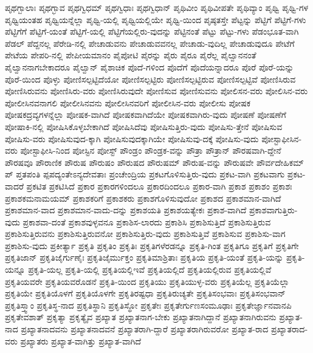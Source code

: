{ಪೃಥಗ್ಬಾಲಾಃ
ಪೃಥಗ್ಭಾವ
ಪೃಥಗ್ವಿಧಮ್
ಪೃಥಗ್ವಿಧಾಃ
ಪೃಥಗ್ವಿಧಾನ್
ಪೃಥಿವೀಂ
ಪೃಥಿವೀಪತೇ
ಪೃಥಿವ್ಯಾಂ
ಪೃಥ್ವಿ
ಪೃಥ್ವಿ-ಗಳ
ಪೃಥ್ವಿಯಂತಹ
ಪೃಥ್ವಿಯನ್ನೆಲ್ಲಾ
ಪೃಥ್ವಿ-ಯಲ್ಲಿ
ಪೃಥ್ವಿಯಲ್ಲಿಯೇ
ಪೃಥ್ವಿ-ಯಿಂದ
ಪೃಷ್ಠತಸ್ತೇ
ಪೆಟ್ಟನ್ನು
ಪೆಟ್ಟಿಗೆ
ಪೆಟ್ಟಿಗೆ-ಗಳು
ಪೆಟ್ಟಿಗೆಗೆ
ಪೆಟ್ಟಿಗೆ-ಯಂತೆ
ಪೆಟ್ಟಿಗೆ-ಯಲ್ಲಿ
ಪೆಟ್ಟಿಗೆಯಲ್ಲಿರು-ವುದನ್ನು
ಪೆಟ್ಟಿನಂತೆ
ಪೆಟ್ಟು
ಪೆಟ್ಟು-ಗಳು
ಪೆಡಂಭೂತ-ವಾಗಿ
ಪೆಡಲ್
ಪೆದ್ದನಲ್ಲ
ಪೆರೇಡಿ-ನಲ್ಲಿ
ಪೇಚಾಡುವನು
ಪೇಚಾಡುವವನಲ್ಲ
ಪೇಚಾಡು-ವುದಿಲ್ಲ
ಪೇಚಾಡುವುದೂ
ಪೇಟೆಗೆ
ಪೇಟೆಯ
ಪೇಪರಿ-ನಲ್ಲಿ
ಪೇಪೀಯಮಾನಂ
ಪೈಪೋಟಿ
ಪೈರನ್ನು
ಪೈರು
ಪೈರೂ
ಪೈರೆಲ್ಲ
ಪೈಲ್ವಾನನಂತೆ
ಪೈಲ್ವಾನನಾಗಬೇಕಾದರೂ
ಪೈಲ್ವಾನ್
ಪೈಶಾಚಿಕ
ಪೊದೆ-ಗಳಿಂದ
ಪೊದೆಗೆ
ಪೊದೆಯನ್ನಾದರೂ
ಪೊರೆ
ಪೊರೆ-ಯನ್ನು
ಪೊರೆ-ಯಿಂದ
ಪೊಳ್ಳು
ಪೋಣಿಸಲ್ಪಟ್ಟಿದೆಯೋ
ಪೋಣಿಸಲ್ಪಟ್ಟಿರು
ಪೋಣಿಸಲ್ಪಟ್ಟಿರುವ
ಪೋಣಿಸಲ್ಪಟ್ಟಿವೆ
ಪೋಣಿಸಿರುವ
ಪೋಣಿಸಿರುವನು
ಪೋಣಿಸಿರು-ವರು
ಪೋಣಿಸಿರುವುದೇ
ಪೋಣಿಸುವ
ಪೋಣಿಸುವನು
ಪೋಲಿಸನ-ವರು
ಪೋಲಿಸಿನ-ವರು
ಪೋಲೀಸಿನವನಾಗಲಿ
ಪೋಲೀಸಿನವನು
ಪೋಲೀಸಿನವರಿಗೆ
ಪೋಲೀಸಿನ-ವರು
ಪೋಲೀಸು
ಪೋಷಕ
ಪೋಷಕದ್ರವ್ಯಗಳನ್ನೆಲ್ಲಾ
ಪೋಷಕ-ವಾಗಿದೆ
ಪೋಷಕವಾಗಿದೆಯೇ
ಪೋಷಕವಾಗಿರು-ವುದು
ಪೋಷಣೆ
ಪೋಷಣೆಗೆ
ಪೋಷಾಕಿ-ನಲ್ಲಿ
ಪೋಷಿಸಿಕೊಳ್ಳಬೇಕಾಗಿದೆ
ಪೋಷಿಸಿದೆವು
ಪೋಷಿಸುತ್ತಿರು-ವುದು
ಪೋಷಿಸು-ತ್ತೇನೆ
ಪೋಷಿಸುವ
ಪೋಷಿಸು-ವರು
ಪೋಷಿಸುವುದ-ಕ್ಕಾಗಿ
ಪೋಷಿಸುವುದಕ್ಕಾಗಿಯೇ
ಪೋಷಿಸುವು-ದಕ್ಕೆ
ಪೋಷಿಸು-ವುದು
ಪೋಸ್ಟಾಫೀಸಿನ-ವರು
ಪೋಸ್ಟಾಫೀಸಿ-ನಿಂದ
ಪೋಸ್ಟಿನ
ಪೋಸ್ಟ್
ಪೌಂಡ್ರಂ
ಪೌಂಡ್ರಕ-ವನ್ನು
ಪೌತ್ರಾ
ಪೌತ್ರಾನ್
ಪೌರಷವಾಗಿ-ದ್ದೇನೆ
ಪೌರಷವೂ
ಪೌರಾಣಿಕ
ಪೌರುಷ
ಪೌರುಷಂ
ಪೌರುಷದ
ಪೌರುಷಮ್
ಪೌರುಷ-ವನ್ನು
ಪೌರುಷವೇ
ಪೌರ್ವದೇಹಿಕಮ್
ಪ್
ಪ್ತತಪಂತಿ
ಪ್ಪಪದ್ಯಂತೇಽನ್ಯದೇವತಾಃ
ಪ್ರಂಚೇಂದ್ರಿಯ
ಪ್ರಕಟಗೊಳಿಸುತ್ತಿರು-ವುದು
ಪ್ರಕಟ-ವಾಗಿ
ಪ್ರಕಟವಾಗು
ಪ್ರಕಟ-ವಾದರೆ
ಪ್ರಕಟಿತ
ಪ್ರಕಟಿಸಿದೆ
ಪ್ರಕಾರ
ಪ್ರಕಾರಗಳಿಂದಲೂ
ಪ್ರಕಾರದಿಂದಲೂ
ಪ್ರಕಾರ-ವಾಗಿ
ಪ್ರಕಾಶ
ಪ್ರಕಾಶಂ
ಪ್ರಕಾಶಃ
ಪ್ರಕಾಶಕಮನಾಮಯಮ್
ಪ್ರಕಾಶಕರಿಗೆ
ಪ್ರಕಾಶಕರು
ಪ್ರಕಾಶಗೊಳಿಸುವುದೋ
ಪ್ರಕಾಶದ
ಪ್ರಕಾಶಮಾನ-ವಾಗಿದೆ
ಪ್ರಕಾಶಮಾನ-ವಾದ
ಪ್ರಕಾಶಮಾನ-ವಾದು-ದನ್ನು
ಪ್ರಕಾಶಯತಿ
ಪ್ರಕಾಶಯತ್ಯೇಕಃ
ಪ್ರಕಾಶ-ವಾಗಿದೆ
ಪ್ರಕಾಶವಾಗುತ್ತಿರು-ವುದು
ಪ್ರಕಾಶವಾ-ದಂತೆ
ಪ್ರಕಾಶವುಳ್ಳವನೂ
ಪ್ರಕಾಶಿಸ-ಲಾರದು
ಪ್ರಕಾಶಿಸಿ
ಪ್ರಕಾಶಿಸುತ್ತಿದೆ
ಪ್ರಕಾಶಿಸುತ್ತಿರುವ
ಪ್ರಕಾಶಿಸುತ್ತಿರುವನು
ಪ್ರಕಾಶಿಸುತ್ತಿರುವನೋ
ಪ್ರಕಾಶಿಸುತ್ತಿರು-ವುದು
ಪ್ರಕಾಶಿಸುತ್ತಿವೆ
ಪ್ರಕಾಶಿಸುವ
ಪ್ರಕಾಶಿಸು-ವಾಗ
ಪ್ರಕಾಶಿಸು-ವುದು
ಪ್ರಕೀರ್ತ್ಯಾ
ಪ್ರಕೃತಿ
ಪ್ರಕೃತಿಂ
ಪ್ರಕೃತಿಃ
ಪ್ರಕೃತಿಗಳೆರಡನ್ನೂ
ಪ್ರಕೃತಿ-ಗಿಂತ
ಪ್ರಕೃತಿಗೂ
ಪ್ರಕೃತಿಗೆ
ಪ್ರಕೃತಿಗೇ
ಪ್ರಕೃತಿಜಾನ್
ಪ್ರಕೃತಿಜೈರ್ಗುಣೈಃ
ಪ್ರಕೃತಿಜೈರ್ಮುಕ್ತಂ
ಪ್ರಕೃತಿಮಾಶ್ರಿತಾಃ
ಪ್ರಕೃತಿಯ
ಪ್ರಕೃತಿ-ಯಂತೆ
ಪ್ರಕೃತಿ-ಯನ್ನು
ಪ್ರಕೃತಿ-ಯನ್ನೂ
ಪ್ರಕೃತಿ-ಯಲ್ಲ
ಪ್ರಕೃತಿ-ಯಲ್ಲಿ
ಪ್ರಕೃತಿಯಲ್ಲಿಇವೆ
ಪ್ರಕೃತಿಯಲ್ಲಿದೆ
ಪ್ರಕೃತಿಯಲ್ಲಿರುವ
ಪ್ರಕೃತಿಯಲ್ಲಿವೆ
ಪ್ರಕೃತಿಯವರೇ
ಪ್ರಕೃತಿಯವರೊಡನೆ
ಪ್ರಕೃತಿ-ಯಿಂದ
ಪ್ರಕೃತಿಯು
ಪ್ರಕೃತಿಯುಳ್ಳ-ವರು
ಪ್ರಕೃತಿಯೆಲ್ಲ
ಪ್ರಕೃತಿಯೆಲ್ಲಾ
ಪ್ರಕೃತಿಯೇ
ಪ್ರಕೃತಿಯೊಳಗೆ
ಪ್ರಕೃತಿಯೊಳಗೇ
ಪ್ರಕೃತಿರಷ್ಟಧಾ
ಪ್ರಕೃತಿರುಚ್ಯತೇ
ಪ್ರಕೃತಿಸಂಭವಾಃ
ಪ್ರಕೃತಿಸಂಭವಾನ್
ಪ್ರಕೃತಿಸ್ತ್ವಾಂ
ಪ್ರಕೃತಿಸ್ಥ-ನಾದ
ಪ್ರಕೃತಿಸ್ಥಾನಿ
ಪ್ರಕೃತಿಸ್ಥೋ
ಪ್ರಕೃತೇಃ
ಪ್ರಕೃತೇರ್ಗುಣಸಂಮೂಢಾಃ
ಪ್ರಕೃತೇರ್ಜ್ಞಾನವಾನಪಿ
ಪ್ರಕೃತೇವಶಾತ್
ಪ್ರಕೃತ್ಯಾ
ಪ್ರಕೃತ್ಯೈವ
ಪ್ರಖ್ಯಾತ
ಪ್ರಖ್ಯಾತನಾಗ-ಬೇಕು
ಪ್ರಖ್ಯಾತನಾಗಿದ್ದಾನೆ
ಪ್ರಖ್ಯಾತನಾಗಿರುವನು
ಪ್ರಖ್ಯಾತ-ನಾದ
ಪ್ರಖ್ಯಾತನಾದವನು
ಪ್ರಖ್ಯಾತನಾದವನೆ
ಪ್ರಖ್ಯಾತರಾಗಿ-ದ್ದಾರೆ
ಪ್ರಖ್ಯಾತರಾಗಿರುವರೋ
ಪ್ರಖ್ಯಾತ-ರಾದ
ಪ್ರಖ್ಯಾತರಾದ-ವರು
ಪ್ರಖ್ಯಾತರು
ಪ್ರಖ್ಯಾತ-ವಾಗಿತ್ತು
ಪ್ರಖ್ಯಾತ-ವಾಗಿದೆ
}
